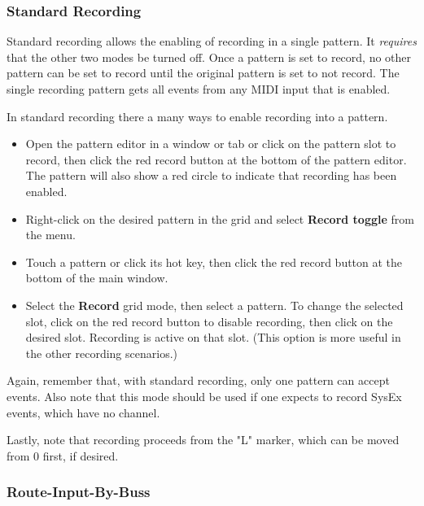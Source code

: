 \subsubsection{Standard Recording}
\label{subsubsec:recording_standard_recording}

   Standard recording allows the enabling of recording in a single pattern.
   It \textsl{requires} that the other two modes be turned off.
   Once a pattern is set to record, no other pattern can be set to record until
   the original pattern is set to not record.
   The single recording pattern gets all events from any MIDI
   input that is enabled.

   In standard recording there a many ways to enable recording into
   a pattern.

   \begin{itemize}
      \item Open the pattern editor in a window or tab or click on the
         pattern slot to record, then click the red record
         button at the bottom of the pattern editor.
         The pattern will also
         show a red circle to indicate that recording has been enabled.
      \item Right-click on the desired pattern in the grid and select
         \textbf{Record toggle} from the menu.
      \item Touch a pattern or click its hot key, then
         click the red record button at the bottom of the main window.
      \item Select the \textbf{Record} grid mode, then select a pattern.
         To change the selected slot, click on the red record button
         to disable recording, then click on the desired slot.
         Recording is active on that slot.
         (This option is more useful in the other recording scenarios.)
   \end{itemize}

   Again, remember that, with standard recording, only one pattern can
   accept events.
   Also note that this mode should be used if one
   expects to record SysEx events, which have no channel.

   Lastly, note that recording proceeds from the "L" marker, which
   can be moved from 0 first, if desired.

\subsubsection{Route-Input-By-Buss}
\label{subsubsec:recording_route_by_buss}

